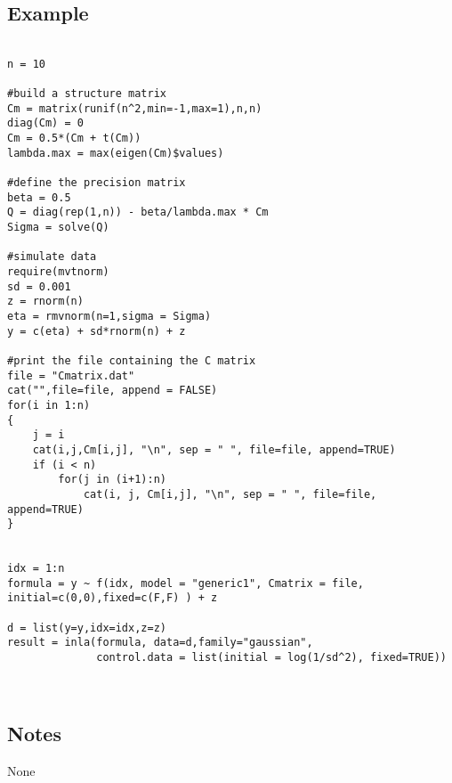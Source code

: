\documentclass[a4paper,11pt]{article}
\begin{document}
\subsection*{Example}
\begin{verbatim}

n = 10

#build a structure matrix
Cm = matrix(runif(n^2,min=-1,max=1),n,n)
diag(Cm) = 0
Cm = 0.5*(Cm + t(Cm))
lambda.max = max(eigen(Cm)$values)

#define the precision matrix
beta = 0.5
Q = diag(rep(1,n)) - beta/lambda.max * Cm
Sigma = solve(Q)

#simulate data
require(mvtnorm)
sd = 0.001
z = rnorm(n)
eta = rmvnorm(n=1,sigma = Sigma)
y = c(eta) + sd*rnorm(n) + z

#print the file containing the C matrix
file = "Cmatrix.dat"
cat("",file=file, append = FALSE)
for(i in 1:n)
{
    j = i
    cat(i,j,Cm[i,j], "\n", sep = " ", file=file, append=TRUE)
    if (i < n)
        for(j in (i+1):n)
            cat(i, j, Cm[i,j], "\n", sep = " ", file=file, append=TRUE)
}


idx = 1:n
formula = y ~ f(idx, model = "generic1", Cmatrix = file, initial=c(0,0),fixed=c(F,F) ) + z

d = list(y=y,idx=idx,z=z)
result = inla(formula, data=d,family="gaussian",
              control.data = list(initial = log(1/sd^2), fixed=TRUE))



\end{verbatim}

\subsection*{Notes}
None
\end{document}
